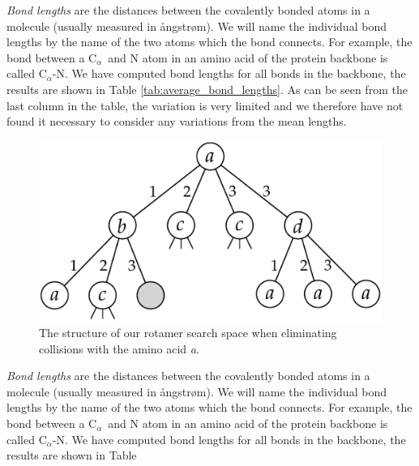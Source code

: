 \documentclass[a0,portrait]{a0poster}
\newcommand{\Ca}{C$_{\alpha}${}}
\begin{document}
\begin{GridBlock}{0}{75}{48}
\textit{Bond lengths} are the distances between the covalently bonded atoms
in a molecule (usually measured in ångstrøm). We will name the
individual bond lengths by the name of the two atoms which the bond
connects. For example, the bond between a \Ca\ and N atom in an amino acid of
the protein backbone is called \Ca -N. We have computed bond lengths
for all bonds in the backbone, the results are shown in Table
\ref{tab:average_bond_lengths}. As can be seen from the last column in
the table, the variation is very limited and we therefore have not
found it necessary to consider any variations from the mean
lengths.
\end{GridBlock}

\begin{GridBlock}{51}{75}{48}
\begin{figure}
    \centering
    \includegraphics[width=.45\textwidth]{../rapport/figures/rotamersearch}
    \caption{The structure of our rotamer search space when
      eliminating collisions with the amino acid \textit{a}.}
    \label{fig:rotamer-search-tree}
\end{figure}
\textit{Bond lengths} are the distances between the covalently bonded atoms
in a molecule (usually measured in ångstrøm). We will name the
individual bond lengths by the name of the two atoms which the bond
connects. For example, the bond between a \Ca\ and N atom in an amino acid of
the protein backbone is called \Ca -N. We have computed bond lengths
for all bonds in the backbone, the results are shown in Table
\end{GridBlock}



\end{document}
